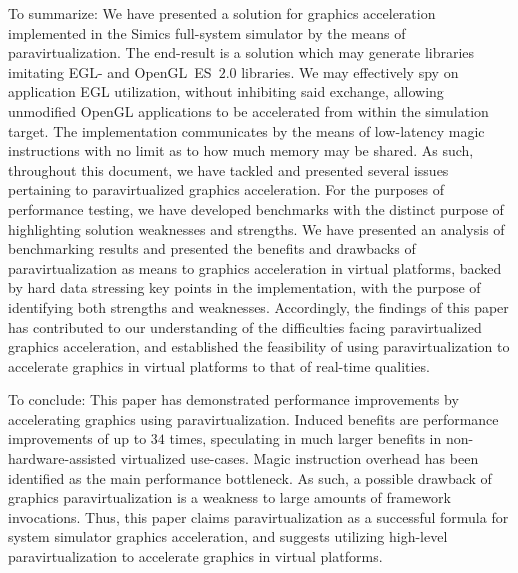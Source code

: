 To summarize: We have presented a solution for graphics acceleration implemented in the Simics full-system simulator by the means of paravirtualization.
The end-result is a solution which may generate libraries imitating EGL- and OpenGL~ES~$2.0$ libraries.
We may effectively spy on application EGL utilization, without inhibiting said exchange, allowing unmodified OpenGL applications to be accelerated from within the simulation target.
The implementation communicates by the means of low-latency magic instructions with no limit as to how much memory may be shared.
As such, throughout this document, we have tackled and presented several issues pertaining to paravirtualized graphics acceleration.
For the purposes of performance testing, we have developed benchmarks with the distinct purpose of highlighting solution weaknesses and strengths.
We have presented an analysis of benchmarking results and presented the benefits and drawbacks of paravirtualization as means to graphics acceleration in virtual platforms, backed by hard data stressing key points in the implementation, with the purpose of identifying both strengths and weaknesses.
Accordingly, the findings of this paper has contributed to our understanding of the difficulties facing paravirtualized graphics acceleration, and established the feasibility of using paravirtualization to accelerate graphics in virtual platforms to that of real-time qualities.

To conclude: This paper has demonstrated performance improvements by accelerating graphics using paravirtualization.
Induced benefits are performance improvements of up to $34$ times, speculating in much larger benefits in non-hardware-assisted virtualized use-cases.
Magic instruction overhead has been identified as the main performance bottleneck.
As such, a possible drawback of graphics paravirtualization is a weakness to large amounts of framework invocations.
Thus, this paper claims paravirtualization as a successful formula for system simulator graphics acceleration, and suggests utilizing high-level paravirtualization to accelerate graphics in virtual platforms.

